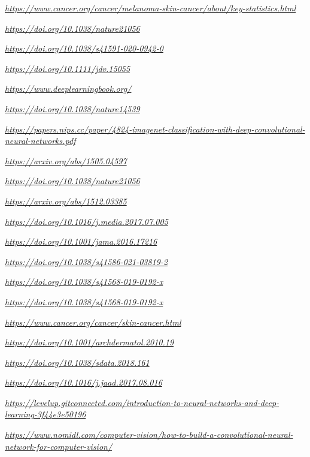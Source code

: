 \documentclass[a4paper,12pt]{report}
\begin{document}
\begin{spacing}{1.5}
\begin{thebibliography}{99}
 \emph{\url{https://www.cancer.org/cancer/melanoma-skin-cancer/about/key-statistics.html}}

 \emph{\url{https://doi.org/10.1038/nature21056}}

 \emph{\url{https://doi.org/10.1038/s41591-020-0942-0}}

 \emph{\url{https://doi.org/10.1111/jdv.15055}}



 \emph{\url{https://www.deeplearningbook.org/}}

 \emph{\url{https://doi.org/10.1038/nature14539}}

 \emph{\url{https://papers.nips.cc/paper/4824-imagenet-classification-with-deep-convolutional-neural-networks.pdf}}

 \emph{\url{https://arxiv.org/abs/1505.04597}}

 \emph{\url{https://doi.org/10.1038/nature21056}}

 \emph{\url{https://arxiv.org/abs/1512.03385}}

 \emph{\url{https://doi.org/10.1016/j.media.2017.07.005}}

 \emph{\url{https://doi.org/10.1001/jama.2016.17216}}

 \emph{\url{https://doi.org/10.1038/s41586-021-03819-2}}

 \emph{\url{https://doi.org/10.1038/s41568-019-0192-x}}

 \emph{\url{https://doi.org/10.1038/s41568-019-0192-x}}

 \emph{\url{https://www.cancer.org/cancer/skin-cancer.html}}

 \emph{\url{https://doi.org/10.1001/archdermatol.2010.19}}

 \emph{\url{https://doi.org/10.1038/sdata.2018.161}}

 \emph{\url{https://doi.org/10.1016/j.jaad.2017.08.016}}




 \emph{\url{https://levelup.gitconnected.com/introduction-to-neural-networks-and-deep-learning-3f44e3e50196}}

    \emph{\url{https://www.nomidl.com/computer-vision/how-to-build-a-convolutional-neural-network-for-computer-vision/}}


\end{thebibliography}

\end{spacing}
\end{document}
